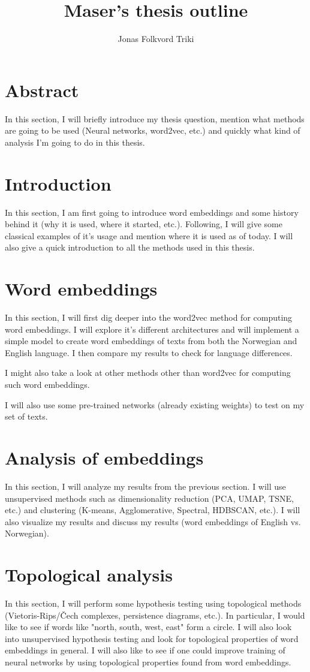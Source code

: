 \documentclass{article}
\title{Maser's thesis outline}
\author{Jonas Folkvord Triki}
\begin{document}
\maketitle

\setcounter{section}{-1}
\section{Abstract}
In this section, I will briefly introduce my thesis question, mention what methods are going to be used (Neural networks, word2vec, etc.) and quickly what kind of analysis I'm going to do in this thesis.

\section{Introduction}
In this section, I am first going to introduce word embeddings and some history behind it (why it is used, where it started, etc.). Following, I will give some classical examples of it's usage and mention where it is used as of today. I will also give a quick introduction to all the methods used in this thesis.

\section{Word embeddings}
In this section, I will first dig deeper into the word2vec method for computing word embeddings. I will explore it's different architectures and will implement a simple model to create word embeddings of texts from both the Norwegian and English language. I then compare my results to check for language differences.

I might also take a look at other methods other than word2vec for computing such word embeddings.

I will also use some pre-trained networks (already existing weights) to test on my set of texts.

\section{Analysis of embeddings}
In this section, I will analyze my results from the previous section. I will use unsupervised methods such as dimensionality reduction (PCA, UMAP, TSNE, etc.) and clustering (K-means, Agglomerative, Spectral, HDBSCAN, etc.). I will also visualize my results and discuss my results (word embeddings of English vs. Norwegian).

\section{Topological analysis}
In this section, I will perform some hypothesis testing using topological methods (Vietoris-Rips/Čech complexes, persistence diagrams, etc.). In particular, I would like to see if words like "north, south, west, east" form a circle. I will also look into unsupervised hypothesis testing and look for topological properties of word embeddings in general. I will also like to see if one could improve training of neural networks by using topological properties found from word embeddings.
\end{document}
